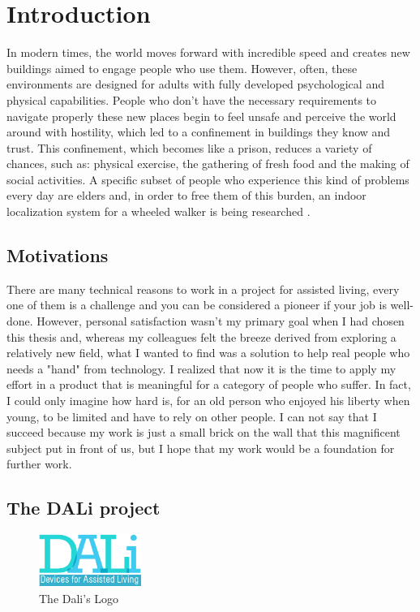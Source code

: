 \chapter{Introduction}
In modern times, the world moves forward with incredible speed and creates new buildings aimed to engage people who use them.
However, often, these environments are designed for adults with fully developed psychological and physical capabilities.
People who don't have the necessary requirements to navigate properly these new places begin to feel unsafe and perceive the world around with hostility, which led to a confinement in buildings they know and trust.
This confinement, which becomes like a prison, reduces a variety of chances, such as: physical exercise, the gathering of fresh food and the making of social activities.
A specific subset of people who experience this kind of problems every day are elders and, in order to free them of this burden, an indoor localization system for a wheeled walker is being researched . 

\section{Motivations}

There are many technical reasons to work in a project for assisted living, every one of them is a challenge and you can be considered a pioneer if your job is well-done.
However, personal satisfaction wasn't my primary goal when I had chosen this thesis and, whereas my colleagues felt the breeze derived from exploring a relatively new field, what I wanted to find was a solution to help real people who needs a "hand" from technology.
I realized that now it is the time to apply my effort in a product that is meaningful for a category of people who suffer. 
In fact, I could only imagine how hard is, for an old person who enjoyed his liberty when young, to be limited and have to rely on other people.
I can not say that I succeed because my work is just a small brick on the wall that this magnificent subject put in front of us, but I hope that my work would be a foundation for further work.

\section{The DALi project}

\vspace{1cm}
\begin{figure}[hbt]
	  \centering
      \includegraphics[width=0.3\textwidth]{img/Dali-logo.png}
      \caption{The Dali's Logo}
\end{figure}
\vspace{1cm}

